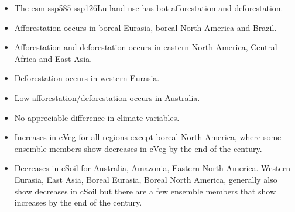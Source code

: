 \documentclass[]{article}
\begin{document}
\begin{itemize}
    \item The esm-ssp585-ssp126Lu land use has bot afforestation and deforestation.
    \item Afforestation occurs in boreal Eurasia, boreal North America and Brazil.
    \item Afforestation and deforestation occurs in eastern North America, Central Africa and East Asia.
    \item Deforestation occurs in western Eurasia.
    \item Low afforestation/deforestation occurs in Australia.
    \item No appreciable difference in climate variables.
    \item Increases in cVeg for all regions except boreal North America, where some ensemble members show decreases in cVeg by the end of the century.
    \item Decreases in cSoil for Australia, Amazonia, Eastern North America. Western Eurasia, East Asia, Boreal Eurasia, Boreal North America, generally also show decreases in cSoil but there are a few ensemble members that show increases by the end of the century.
\end{itemize}
\end{document}
